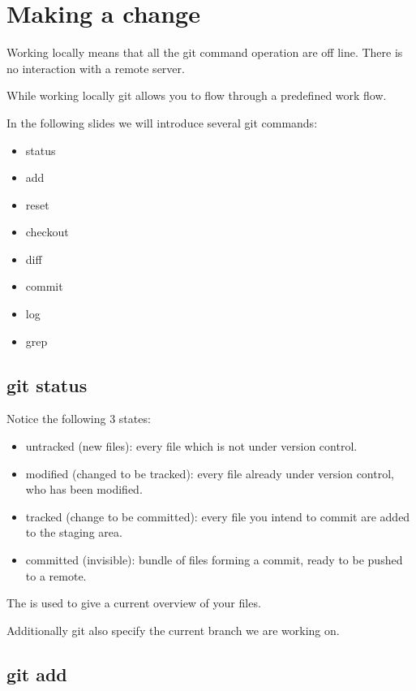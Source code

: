\section{Making a change}
\begin{frame}[fragile]
  \slidetitle

Working locally means that all the git command operation are off line.
There is no interaction with a remote server.

While working locally git allows you to flow through a predefined work flow.


In the following slides we will introduce several git commands:
\begin{itemize}
\item status
\item add
\item reset
\item checkout
\item diff
\item commit
\item log
\item grep
\end{itemize}
\end{frame}

\subsection{git status}
\begin{frame}[fragile]
    \subslidetitle
Notice the following 3 states:
\begin{itemize}
\item untracked (new files): every file which is not under version control.
\item modified (changed to be tracked): every file already under version control, who has been modified.
\item tracked (change to be committed): every file you intend to commit are added to the staging area.
\item committed (invisible): bundle of files forming a commit, ready to be pushed to a remote.
\end{itemize}

The  is used to give a current overview of your files.

Additionally git also specify the current branch we are working on.
\end{frame}

\subsection{git add}
\begin{frame}[fragile]
    \subslidetitle
\end{frame}

